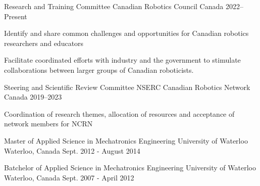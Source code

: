 \documentclass[11pt, a4paper]{awesome-cv}
\begin{document}
\vspace{-8mm}
\begin{cventries}
\cventry
  {Research and Training Committee}
  {Canadian Robotics Council}
  {Canada}
  {2022--Present}
  {
    \begin{cvitems}
      \item Identify and share common challenges and opportunities for Canadian robotics researchers and educators
      \item Facilitate coordinated efforts with industry and the government to stimulate collaborations between larger groups of Canadian roboticists.
    \end{cvitems}
  }

\vspace{-1mm}
\cventry
  {Steering and Scientific Review Committee}
  {NSERC Canadian Robotics Network}
  {Canada}
  {2019--2023}
  {
    \begin{cvitems}
      \item Coordination of research themes, allocation of resources and acceptance of network members for NCRN 
    \end{cvitems}
  }
\end{cventries}


\begin{cventries}

  \cventry
    {Master of Applied Science in Mechatronics Engineering} %
    {University of Waterloo} %
    {Waterloo, Canada} %
    {Sept. 2012 - August 2014} %
    {
    }

\vspace{-4mm}
  \cventry
    {Batchelor of Applied Science in Mechatronics Engineering} %
    {University of Waterloo} %
    {Waterloo, Canada} %
    {Sept. 2007 - April 2012} %
    {}

\end{cventries}
\end{document}
